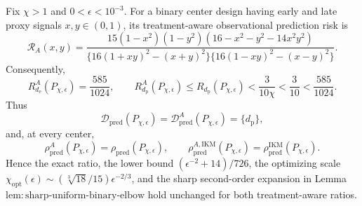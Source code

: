 Fix \(\chi>1\) and \(0<\epsilon<10^{-3}\). For a binary center design having early and late proxy signals \(x,y\in(0,1)\), its treatment-aware observational prediction risk is
\[
 \mathcal R_A(x,y)=
 \frac{15(1-x^2)(1-y^2)(16-x^2-y^2-14x^2y^2)}
 {\{16(1+xy)^2-(x+y)^2\}\{16(1-xy)^2-(x-y)^2\}}. \tag{1}
\]
Consequently,
\[
 R_{d_{\mathrm e}}^A(P_{\chi,\epsilon})=\frac{585}{1024},
 \qquad
 R_{d_{\mathrm p}}^A(P_{\chi,\epsilon})
 \le R_{d_{\mathrm p}}(P_{\chi,\epsilon})
 <\frac{3}{10\chi}<\frac3{10}<\frac{585}{1024}. \tag{2}
\]
Thus
\[
 \mathcal D_{\mathrm{pred}}(P_{\chi,\epsilon})
 =\mathcal D_{\mathrm{pred}}^A(P_{\chi,\epsilon})
 =\{d_{\mathrm p}\},
\]
and, at every center,
\[
 \rho_{\mathrm{pred}}^A(P_{\chi,\epsilon})
 =\rho_{\mathrm{pred}}(P_{\chi,\epsilon}),
 \qquad
 \rho_{\mathrm{pred}}^{A,\mathrm{IKM}}(P_{\chi,\epsilon})
 =\rho_{\mathrm{pred}}^{\mathrm{IKM}}(P_{\chi,\epsilon}). \tag{3}
\]
Hence the exact ratio, the lower bound \((\epsilon^{-2}+14)/726\), the optimizing scale \(\chi_{\mathrm{opt}}(\epsilon)\sim(\sqrt[3]{18}/15)\epsilon^{-2/3}\), and the sharp second-order expansion in Lemma~\(\mathrm{lem{:}sharp\text{-}uniform\text{-}binary\text{-}elbow}\) hold unchanged for both treatment-aware ratios.